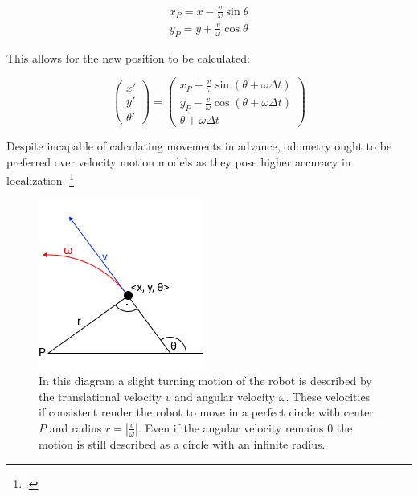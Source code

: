 \begin{equation}
	\begin{split}
		x_{P} = x - \frac{v}{\omega} \sin \theta \\
		y_{P} = y + \frac{v}{\omega} \cos \theta
	\end{split}
\end{equation}

This allows for the new position to be calculated: 

\begin{equation}
	\begin{pmatrix}
		x' \\
		y' \\
		\theta'
	\end{pmatrix}
	=
	\begin{pmatrix}
		x_{P} + \frac{v}{\omega} \sin(\theta + \omega \Delta t) \\
		y_{P} - \frac{v}{\omega} \cos(\theta + \omega \Delta t) \\
		\theta + \omega \Delta t
	\end{pmatrix}
\end{equation}

Despite incapable of calculating movements in advance, odometry ought to be preferred over velocity motion models as they pose higher accuracy in localization. \footcite[Page 107]{thrun2002probabilisticRobotics}

\begin{figure}
	\centering
	\includegraphics[width=0.5\linewidth]{img/inertial}
	\caption{
		In this diagram a slight turning motion of the robot is described by the translational velocity $v$ and angular velocity $\omega$. These velocities if consistent render the robot to move in a perfect circle with center $P$ and radius $r = | \frac{v}{\omega}|$. Even if the angular velocity remains 0 the motion is still described as a circle with an infinite radius.
	}
	\label{fig:inertial}
\end{figure}



